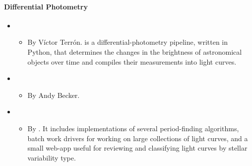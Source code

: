 \documentclass[letterpaper,10pt,english]{sphinxmanual}
\begin{document}
\paragraph{Differential Photometry}
\label{\detokenize{resource/astro/topics/transient_and_time_domain:differential-photometry}}\begin{itemize}
\item {} 
\begin{itemize}
\item {} 
By Víctor Terrón.  is a differential-photometry pipeline,
written in Python, that determines the changes in the brightness
of astronomical objects over time and compiles their measurements
into light curves.

\end{itemize}

\item {} 
\begin{itemize}
\item {} 
By Andy Becker.

\end{itemize}

\item {} 
\begin{itemize}
\item {} 
By . It includes
implementations of several period-finding algorithms, batch work
drivers for working on large collections of light curves, and a
small web-app useful for reviewing and classifying light curves by
stellar variability type.

\end{itemize}

\end{itemize}
\end{document}
